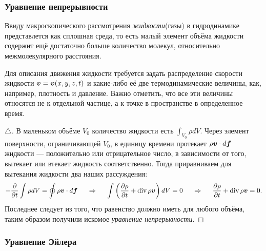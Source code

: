 \subsubsection*{Уравнение непрерывности}
\begin{to_def}
	Ввиду макроскопического рассмотрения \textit{жидкости}(газы) в гидродинамике представлется как сплошная среда, то есть малый элемент объёма жидкости содержит ещё достаточно больше количество молекул, относительно межмолекулярного расстояния.
\end{to_def}

Для описания движения жидкости требуется задать распределение скорости жидкости $\mbox{\boldmath $v$} = \mbox{\boldmath $v$}(x,y,z,t)$ и какие-либо её две термодинамические величины, как, например, плотность и давление. Важно отметить, что все эти величины относятся не к отдельной частице, а к точке в пространстве в определенное время.

\begin{to_thr}
\phantom{239}

\begin{proof}[$\triangle$]
	В маленьком объёме $V_{0}$ количество жидкости есть $\int_{V_0} \rho d V$.
	Через элемент поверхности, ограничивающей $V_0$, в единицу времени протекает $\rho \mbox{\boldmath $v$} \cdot d \mbox{\boldmath $f$}$ жидкости --- положительно или отрицательное число, в зависимости от того, вытекает или втекает жидкость соответственно.
	Тогда приравниваем для вытекания жидкости два наших рассуждения:
	\begin{equation*}
		- \frac{\partial}{\partial t} \int \rho d V =  \oint \rho \mbox{\boldmath $v$} \cdot d \mbox{\boldmath $f$}
		\hspace*{0.5 cm} 
		\Rightarrow 
		\hspace*{0.5 cm}
		\int \left(\frac{\partial \rho}{\partial t} + \mathop{\mathrm{div}}\nolimits \rho \mbox{\boldmath $v$}\right)d V = 0
		\hspace*{0.5 cm}
		\Rightarrow
		\hspace*{0.5 cm}
		\frac{\partial \rho}{\partial t} + \mathop{\mathrm{div}}\nolimits \rho \mbox{\boldmath $v$} = 0.
	\end{equation*}
	Последнее следует из того, что равенство должно иметь для любого объёма, таким образом получили искомое \textit{уравнение непрерывности}.
\end{proof}
	
\end{to_thr}

\subsubsection*{Уравнение Эйлера}

